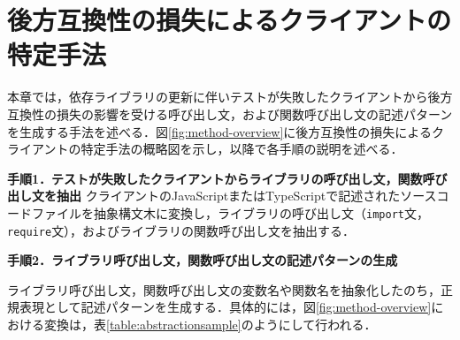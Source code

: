 \documentclass[T,J]{fose} %
\newcommand{\todo}[1]{\colorbox{yellow}{{\bf TODO}:}{\color{red} {\textbf{[#1]}}}}
\newcommand{\change}[1]{\colorbox{green}{{\bf CHANGE}:}{\color{red} {\textbf{[#1]}}}}
\begin{document}

\section{後方互換性の損失によるクライアントの特定手法}\label{sec:method}

本章では，依存ライブラリの更新に伴いテストが失敗したクライアントから後方互換性の損失の影響を受ける呼び出し文，および関数呼び出し文の記述パターンを生成する手法を述べる．図\ref{fig:method-overview}に後方互換性の損失によるクライアントの特定手法の概略図を示し，以降で各手順の説明を述べる．


\noindent\textbf{手順1．テストが失敗したクライアントからライブラリの呼び出し文，関数呼び出し文を抽出}
クライアントのJavaScriptまたはTypeScriptで記述されたソースコードファイルを抽象構文木に変換し，ライブラリの呼び出し文（\texttt{import}文，\texttt{require}文），およびライブラリの関数呼び出し文を抽出する．

\noindent\textbf{手順2．ライブラリ呼び出し文，関数呼び出し文の記述パターンの生成}

ライブラリ呼び出し文，関数呼び出し文の変数名や関数名を抽象化したのち，正規表現として記述パターンを生成する．具体的には，図\ref{fig:method-overview}における変換は，表\ref{table:abstractionsample}のようにして行われる．
\end{document}
